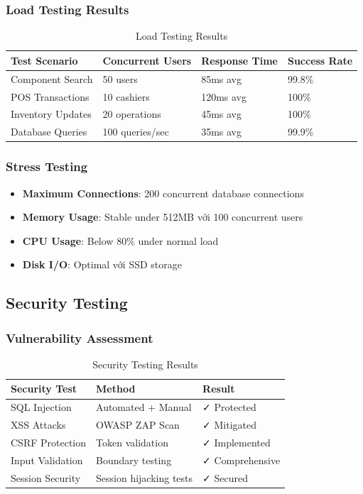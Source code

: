 \documentclass[12pt,a4paper]{article}
\begin{document}
\subsubsection{Load Testing Results}
\begin{table}[H]
\centering
\begin{tabular}{@{}llll@{}}
\toprule
\textbf{Test Scenario} & \textbf{Concurrent Users} & \textbf{Response Time} & \textbf{Success Rate} \\
\midrule
Component Search & 50 users & 85ms avg & 99.8\% \\
POS Transactions & 10 cashiers & 120ms avg & 100\% \\
Inventory Updates & 20 operations & 45ms avg & 100\% \\
Database Queries & 100 queries/sec & 35ms avg & 99.9\% \\
\bottomrule
\end{tabular}
\caption{Load Testing Results}
\end{table}

\subsubsection{Stress Testing}
\begin{itemize}
    \item \textbf{Maximum Connections}: 200 concurrent database connections
    \item \textbf{Memory Usage}: Stable under 512MB với 100 concurrent users
    \item \textbf{CPU Usage}: Below 80\% under normal load
    \item \textbf{Disk I/O}: Optimal với SSD storage
\end{itemize}

\subsection{Security Testing}
\subsubsection{Vulnerability Assessment}
\begin{table}[H]
\centering
\begin{tabular}{@{}lll@{}}
\toprule
\textbf{Security Test} & \textbf{Method} & \textbf{Result} \\
\midrule
SQL Injection & Automated + Manual & ✓ Protected \\
XSS Attacks & OWASP ZAP Scan & ✓ Mitigated \\
CSRF Protection & Token validation & ✓ Implemented \\
Input Validation & Boundary testing & ✓ Comprehensive \\
Session Security & Session hijacking tests & ✓ Secured \\
\bottomrule
\end{tabular}
\caption{Security Testing Results}
\end{table}
\end{document}
